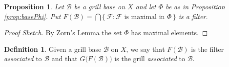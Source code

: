 \documentclass[12pt]{article}
\theoremstyle{plain}
\newtheorem{prop}[thm]{Proposition}
\theoremstyle{definition}
\newtheorem{defn}[thm]{Definition}
\newcommand{\calB}{\mathcal{B}}
\newcommand{\calF}{\mathcal{F}}
\begin{document}
\begin{prop}
  Let $\calB$ be a grill base on $X$ and let $\Phi$ be as in
  Proposition \ref{prop:basePhi}.
  Put $F(\calB) = \bigcap\{\, \calF : \calF \mbox{ is maximal in }
  \Phi \,\}$ is a filter.
\end{prop}
\begin{proof}[Proof Sketch]
  By Zorn's Lemma the set $\Phi$ has maximal elements.
\end{proof}

\begin{defn}
  Given a grill base $\calB$ on $X$, we say that $F(\calB)$ is the
  filter \textsl{associated} to $\calB$ and that
  $G\bigl(F(\calB)\bigr)$ is the grill \textsl{associated} to $\calB$.
\end{defn}
\end{document}
